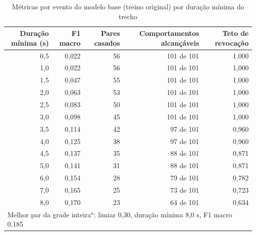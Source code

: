 \begin{table}[htbp]
\centering
\small
\caption{Métricas por evento do modelo base (treino original) por duração mínima do trecho}
\label{tab:grade-evento}
\begin{tabular}{rrrrr}
\toprule
Duração mínima (s) & F1 macro & Pares casados & Comportamentos alcançáveis & Teto de revocação \\
\midrule
0,5 & 0,022 & 56 & 101 de 101 & 1,000 \\
1,0 & 0,022 & 56 & 101 de 101 & 1,000 \\
1,5 & 0,047 & 55 & 101 de 101 & 1,000 \\
2,0 & 0,063 & 53 & 101 de 101 & 1,000 \\
2,5 & 0,083 & 50 & 101 de 101 & 1,000 \\
3,0 & 0,098 & 45 & 101 de 101 & 1,000 \\
3,5 & 0,114 & 42 & 97 de 101 & 0,960 \\
4,0 & 0,125 & 38 & 97 de 101 & 0,960 \\
4,5 & 0,137 & 35 & 88 de 101 & 0,871 \\
5,0 & 0,141 & 31 & 88 de 101 & 0,871 \\
6,0 & 0,154 & 28 & 79 de 101 & 0,782 \\
7,0 & 0,165 & 25 & 73 de 101 & 0,723 \\
8,0 & 0,170 & 23 & 64 de 101 & 0,634 \\
\midrule
\multicolumn{5}{l}{Melhor par da grade inteira$^{a}$: limiar 0,30, duração mínima 8,0 s, F1 macro 0,185} \\
\bottomrule
\end{tabular}
\end{table}


